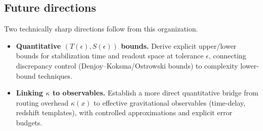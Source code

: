 \subsection*{Future directions}
Two technically sharp directions follow from this organization.

\begin{itemize}
    \item \textbf{Quantitative $(T(\epsilon),S(\epsilon))$ bounds.} Derive explicit upper/lower bounds for stabilization time and readout space at tolerance $\epsilon$, connecting discrepancy control (Denjoy--Koksma/Ostrowski bounds) to complexity lower-bound techniques.
    \item \textbf{Linking $\kappa$ to observables.} Establish a more direct quantitative bridge from routing overhead $\kappa(x)$ to effective gravitational observables (time-delay, redshift templates), with controlled approximations and explicit error budgets.
\end{itemize}
